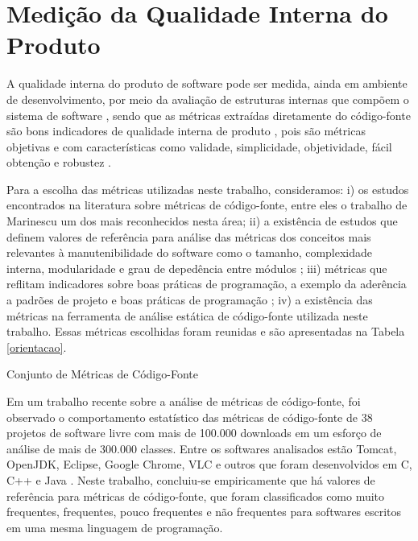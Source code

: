 \section{Medição da Qualidade Interna do Produto}

A qualidade interna do produto de software pode ser medida, ainda em ambiente de desenvolvimento, por meio da avaliação de estruturas internas que compõem o sistema de software \cite{ISO25023}, sendo que as métricas extraídas diretamente do código-fonte são bons indicadores de qualidade interna de produto \cite{beck2003test}, pois são métricas objetivas e com características como validade, simplicidade, objetividade, fácil obtenção e robustez \cite{Mills:1999}.  


Para a escolha das métricas utilizadas neste trabalho, consideramos: i) os estudos encontrados na literatura sobre métricas de código-fonte, entre eles o trabalho de Marinescu \cite{marinescu2005measurement} um dos mais reconhecidos nesta área; ii) a existência de estudos que definem valores de referência para análise das métricas dos conceitos mais relevantes à manutenibilidade do software como o tamanho, complexidade interna, modularidade e grau de depedência entre módulos \cite{Meirelles2013}; iii) métricas que reflitam indicadores sobre boas práticas de programação, a exemplo da aderência a padrões de projeto e boas práticas de programação \cite{Machini2010}; iv) a existência das métricas na ferramenta de análise estática de código-fonte utilizada neste trabalho. Essas métricas escolhidas foram reunidas e são apresentadas na Tabela \ref{orientacao}.     


	\begin{table}[h]
	\caption{Conjunto de Métricas de Código-Fonte}
	\addtolength{\belowcaptionskip}{6pt}
	\begin{center}
	
	\label{orientacao}
	\end{center}
	\end{table}


Em um trabalho recente sobre a análise de métricas de código-fonte, foi observado o comportamento estatístico das métricas de código-fonte de 38 projetos de software livre com mais de 100.000 downloads em um esforço de análise de mais de 300.000 classes. Entre os softwares analisados estão Tomcat, OpenJDK, Eclipse, Google Chrome, VLC e outros que foram desenvolvidos em C, C++ e Java \cite{Meirelles2013}. Neste trabalho, concluiu-se empiricamente que há valores de referência para métricas de código-fonte, que foram classificados como muito frequentes, frequentes, pouco frequentes e não frequentes para softwares escritos em uma mesma linguagem de programação.

